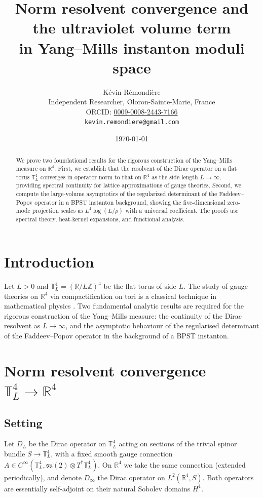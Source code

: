 \documentclass[11pt,a4paper]{amsart}
\title{Norm resolvent convergence and the ultraviolet volume term\\ in Yang--Mills instanton moduli space}
\author{K\'evin R\'emondi\`ere\\
\small Independent Researcher, Oloron-Sainte-Marie, France\\
\small ORCID: \href{https://orcid.org/0009-0008-2443-7166}{0009-0008-2443-7166}\\
\small \texttt{kevin.remondiere@gmail.com}}
\date{\today}
\theoremstyle{remark}
\begin{document}
\begin{abstract}
We prove two foundational results for the rigorous construction of the Yang--Mills measure on $\mathbb{R}^4$. First, we establish that the resolvent of the Dirac operator on a flat torus $\mathbb{T}^4_L$ converges in operator norm to that on $\mathbb{R}^4$ as the side length $L\to\infty$, providing spectral continuity for lattice approximations of gauge theories. Second, we compute the large-volume asymptotics of the regularized determinant of the Faddeev--Popov operator in a BPST instanton background, showing the five-dimensional zero-mode projection scales as $L^4\log(L/\rho)$ with a universal coefficient. The proofs use spectral theory, heat-kernel expansions, and functional analysis.
\end{abstract}

\maketitle

\section{Introduction}

Let $L>0$ and $\mathbb{T}^4_L = (\mathbb{R}/L\mathbb{Z})^4$ be the flat torus of side $L$. The study of gauge theories on $\mathbb{R}^4$ via compactification on tori is a classical technique in mathematical physics \cite{CITE_NEEDED:reed-simon-1978}. Two fundamental analytic results are required for the rigorous construction of the Yang--Mills measure: the continuity of the Dirac resolvent as $L\to\infty$, and the asymptotic behaviour of the regularised determinant of the Faddeev--Popov operator in the background of a BPST instanton.

\section{Norm resolvent convergence $\mathbb{T}^4_L\to\mathbb{R}^4$}

\subsection{Setting}

Let $D_L$ be the Dirac operator on $\mathbb{T}^4_L$ acting on sections of the trivial spinor bundle $S\to\mathbb{T}^4_L$, with a fixed smooth gauge connection $A\in C^\infty(\mathbb{T}^4_L,\mathfrak{su}(2)\otimes T^*\mathbb{T}^4_L)$. On $\mathbb{R}^4$ we take the same connection (extended periodically), and denote $D_\infty$ the Dirac operator on $L^2(\mathbb{R}^4,S)$. Both operators are essentially self-adjoint on their natural Sobolev domains $H^1$.
\end{document}
